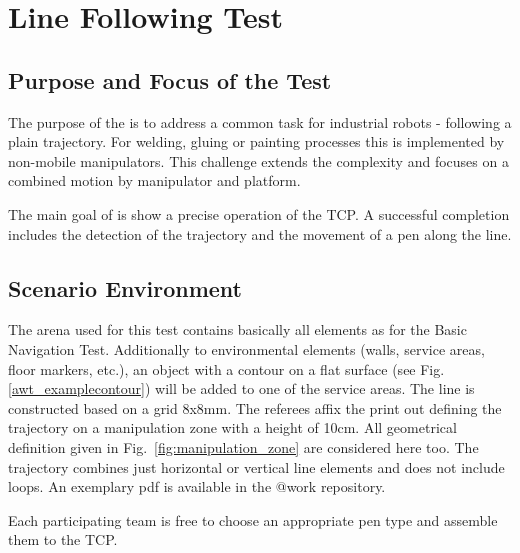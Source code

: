 \newpage
\section{Line Following Test}

\subsection{Purpose and Focus of the Test}
The purpose of the  is to address a common task
for industrial robots - following a plain trajectory. For welding, gluing or
painting processes this is implemented by non-mobile manipulators.  This
challenge extends the complexity and focuses on a combined motion by manipulator
and platform. \par The main goal of is show a precise operation of the TCP. A
successful completion includes the detection of the trajectory and the movement
of a pen along the line.

\subsection{Scenario Environment}
The arena used for this test contains basically all elements as for the Basic
Navigation Test. Additionally to environmental elements (walls, service areas,
floor markers, etc.), an object with a contour on a flat surface (see Fig.
\ref{awt_examplecontour}) will be added to one of the service areas. The line is
constructed based on a grid 8x8mm. The referees affix the print out defining the
trajectory on a manipulation zone with a height of 10cm. All geometrical
definition given in Fig.~\ref{fig:manipulation_zone} are considered here too.
The trajectory combines just horizontal or vertical line elements and does not
include loops. An exemplary pdf is available in the @work repository.

Each participating team is free to choose an appropriate pen type and assemble
them to the TCP.

